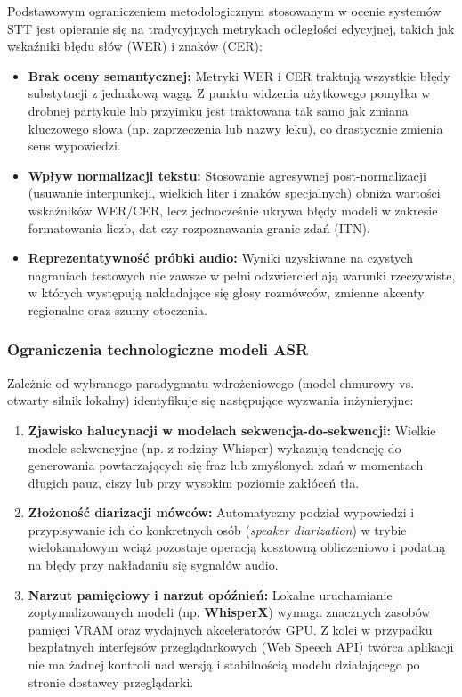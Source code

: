Podstawowym ograniczeniem metodologicznym stosowanym w ocenie systemów STT jest opieranie się na tradycyjnych metrykach odległości edycyjnej, takich jak wskaźniki błędu słów (WER) i znaków (CER):
\begin{itemize}
    \item \textbf{Brak oceny semantycznej:} Metryki WER i CER traktują wszystkie błędy substytucji z jednakową wagą. Z punktu widzenia użytkowego pomyłka w drobnej partykule lub przyimku jest traktowana tak samo jak zmiana kluczowego słowa (np. zaprzeczenia lub nazwy leku), co drastycznie zmienia sens wypowiedzi.
    \item \textbf{Wpływ normalizacji tekstu:} Stosowanie agresywnej post-normalizacji (usuwanie interpunkcji, wielkich liter i znaków specjalnych) obniża wartości wskaźników WER/CER, lecz jednocześnie ukrywa błędy modeli w zakresie formatowania liczb, dat czy rozpoznawania granic zdań (ITN).
    \item \textbf{Reprezentatywność próbki audio:} Wyniki uzyskiwane na czystych nagraniach testowych nie zawsze w pełni odzwierciedlają warunki rzeczywiste, w których występują nakładające się głosy rozmówców, zmienne akcenty regionalne oraz szumy otoczenia.
\end{itemize}

\subsubsection{Ograniczenia technologiczne modeli ASR}

Zależnie od wybranego paradygmatu wdrożeniowego (model chmurowy vs. otwarty silnik lokalny) identyfikuje się następujące wyzwania inżynieryjne:
\begin{enumerate}
    \item \textbf{Zjawisko halucynacji w modelach sekwencja-do-sekwencji:} Wielkie modele sekwencyjne (np. z rodziny Whisper) wykazują tendencję do generowania powtarzających się fraz lub zmyślonych zdań w momentach długich pauz, ciszy lub przy wysokim poziomie zakłóceń tła.
    \item \textbf{Złożoność diarizacji mówców:} Automatyczny podział wypowiedzi i przypisywanie ich do konkretnych osób (\textit{speaker diarization}) w trybie wielokanałowym wciąż pozostaje operacją kosztowną obliczeniowo i podatną na błędy przy nakładaniu się sygnałów audio.
    \item \textbf{Narzut pamięciowy i narzut opóźnień:} Lokalne uruchamianie zoptymalizowanych modeli (np. \textbf{WhisperX}) wymaga znacznych zasobów pamięci VRAM oraz wydajnych akceleratorów GPU. Z kolei w przypadku bezpłatnych interfejsów przeglądarkowych (Web Speech API) twórca aplikacji nie ma żadnej kontroli nad wersją i stabilnością modelu działającego po stronie dostawcy przeglądarki.
\end{enumerate}


